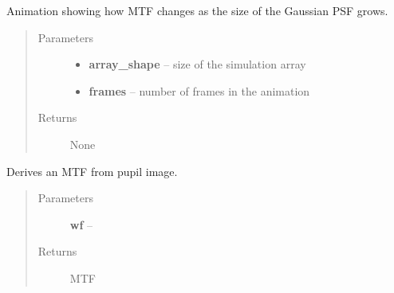 \documentclass[a4paper,11pt,english]{sphinxmanual}
\begin{document}

\begin{fulllineitems}
\label{instrument:sandbox.MTF.GaussianAnimation}
Animation showing how MTF changes as the size of the Gaussian PSF grows.
\begin{quote}\begin{description}
\item[{Parameters}] \leavevmode\begin{itemize}
\item {} 
\textbf{array\_shape} -- size of the simulation array

\item {} 
\textbf{frames} -- number of frames in the animation

\end{itemize}

\item[{Returns}] \leavevmode
None

\end{description}\end{quote}

\end{fulllineitems}


\begin{fulllineitems}
\label{instrument:sandbox.MTF.MTF}
Derives an MTF from pupil image.
\begin{quote}\begin{description}
\item[{Parameters}] \leavevmode
\textbf{wf} -- 

\item[{Returns}] \leavevmode
MTF

\end{description}\end{quote}

\end{fulllineitems}

\end{document}
